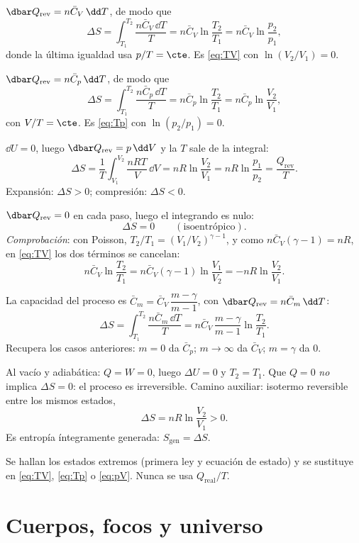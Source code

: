 \documentclass[11pt,a4paper]{article}
\newcommand{\Cv}{\bar C_V}
\newcommand{\Cp}{\bar C_p}
\begin{document}
$\dbar Q_{\mathrm{rev}}=n\Cv\,\dd T$, de modo que
\[
  \Delta S=\int_{T_1}^{T_2}\frac{n\Cv\,\dd T}{T}=n\Cv\ln\frac{T_2}{T_1}=n\Cv\ln\frac{p_2}{p_1},
\]
donde la última igualdad usa $p/T=\cte$. Es \eqref{eq:TV} con $\ln(V_2/V_1)=0$.

$\dbar Q_{\mathrm{rev}}=n\Cp\,\dd T$, de modo que
\[
  \Delta S=\int_{T_1}^{T_2}\frac{n\Cp\,\dd T}{T}=n\Cp\ln\frac{T_2}{T_1}=n\Cp\ln\frac{V_2}{V_1},
\]
con $V/T=\cte$. Es \eqref{eq:Tp} con $\ln(p_2/p_1)=0$.

$\dd U=0$, luego $\dbar Q_{\mathrm{rev}}=p\,\dd V$ y la $T$ sale de la integral:
\[
  \Delta S=\frac1T\int_{V_1}^{V_2}\frac{nRT}{V}\,\dd V=nR\ln\frac{V_2}{V_1}=nR\ln\frac{p_1}{p_2}=\frac{Q_{\mathrm{rev}}}{T}.
\]
Expansión: $\Delta S>0$; compresión: $\Delta S<0$.

$\dbar Q_{\mathrm{rev}}=0$ en cada paso, luego el integrando es nulo:
\[
  \Delta S=0\qquad(\text{isoentrópico}).
\]
\emph{Comprobación}: con Poisson, $T_2/T_1=(V_1/V_2)^{\gamma-1}$, y como $n\Cv(\gamma-1)=nR$, en
\eqref{eq:TV} los dos términos se cancelan:
\[
  n\Cv\ln\frac{T_2}{T_1}=n\Cv(\gamma-1)\ln\frac{V_1}{V_2}=-nR\ln\frac{V_2}{V_1}.
\]

La capacidad del proceso es $\bar C_m=\Cv\,\dfrac{m-\gamma}{m-1}$, con $\dbar Q_{\mathrm{rev}}=n\bar C_m\,\dd T$:
\[
  \Delta S=\int_{T_1}^{T_2}\frac{n\bar C_m\,\dd T}{T}=n\Cv\,\frac{m-\gamma}{m-1}\ln\frac{T_2}{T_1}.
\]
Recupera los casos anteriores: $m=0$ da $\Cp$; $m\to\infty$ da $\Cv$; $m=\gamma$ da $0$.

Al vacío y adiabática: $Q=W=0$, luego $\Delta U=0$ y $T_2=T_1$. Que $Q=0$ \emph{no} implica $\Delta S=0$: el
proceso es irreversible. Camino auxiliar: isotermo reversible entre los mismos estados,
\[
  \Delta S=nR\ln\frac{V_2}{V_1}>0.
\]
Es entropía íntegramente generada: $S_{\mathrm{gen}}=\Delta S$.

Se hallan los estados extremos (primera ley y ecuación de estado) y se sustituye en \eqref{eq:TV},
\eqref{eq:Tp} o \eqref{eq:pV}. Nunca se usa $Q_{\mathrm{real}}/T$.

\section{Cuerpos, focos y universo}
\end{document}
